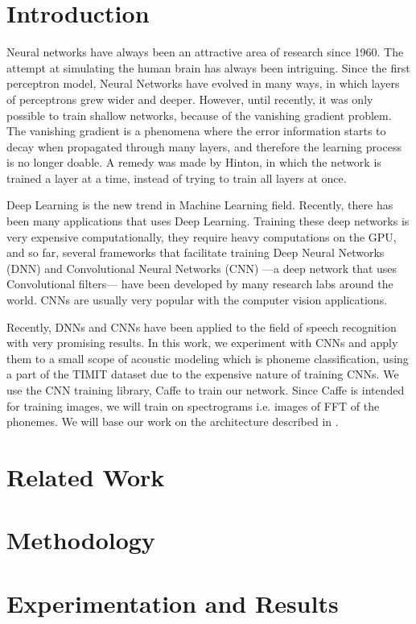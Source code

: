 \documentclass[a4paper,12pt]{report}
\begin{document}
\chapter{Introduction}

Neural networks have always been an attractive area of research since 1960. The attempt at simulating the human brain has always been intriguing. Since the first perceptron model, Neural Networks have evolved in many ways, in which layers of perceptrons grew wider and deeper. However, until recently, it was only possible to train shallow networks, because of the vanishing gradient problem. The vanishing gradient is a phenomena where the error information starts to decay when propagated through many layers, and therefore the learning process is no longer doable. A remedy was made by Hinton\cite{hinton2006reducing}, in which the network is trained a layer at a time, instead of trying to train all layers at once.

Deep Learning is the new trend in Machine Learning field. Recently, there has been many applications that uses Deep Learning. Training these deep networks is very expensive computationally, they require heavy computations on the GPU, and so far, several frameworks that facilitate training Deep Neural Networks (DNN) and Convolutional Neural Networks (CNN) ---a deep network that uses Convolutional filters--- have been developed by many research labs around the world. CNNs are usually very popular with the computer vision applications.

Recently, DNNs and CNNs have been applied to the field of speech recognition with very promising results. In this work, we experiment with CNNs and apply them to a small scope of acoustic modeling which is phoneme classification, using a part of the TIMIT dataset due to the expensive nature of training CNNs. We use the CNN training library, Caffe to train our network. Since Caffe is intended for training images, we will train on spectrograms i.e. images of FFT of the phonemes. We will base our work on the architecture described in \cite{sainath2013deep}.

\chapter{Related Work}



\chapter{Methodology}

\chapter{Experimentation and Results}




\end{document}
